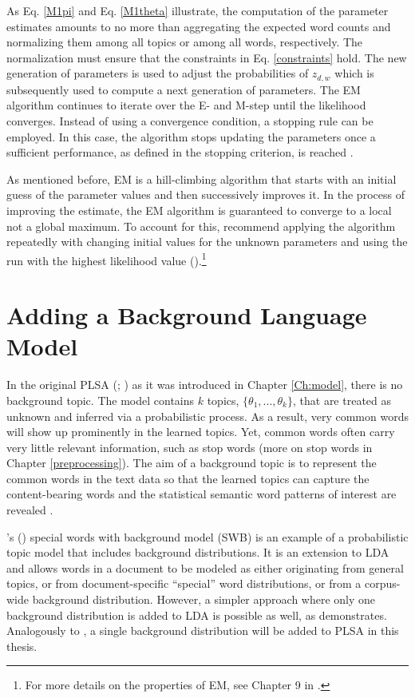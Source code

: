 \documentclass[11pt,a4paper,english,oneside]{book}
\numberwithin{equation}{chapter}
\begin{document}
As Eq. \ref{M1pi} and Eq. \ref{M1theta} illustrate, the computation of the parameter estimates amounts to no more than aggregating the expected word counts and normalizing them among all topics or among all words, respectively. The normalization must ensure that the constraints in Eq. \ref{constraints} hold. The new generation of parameters is used to adjust the probabilities of $z_{d,w}$ which is subsequently used to compute a next generation of parameters. The EM algorithm continues to iterate over the E- and M-step until the likelihood converges. Instead of using a convergence condition, a stopping rule can be employed. In this case, the algorithm stops updating the parameters once a sufficient performance, as defined in the stopping criterion, is reached \citep[pp. 182--183]{Hofmann.2001}. 

As mentioned before, EM is a hill-climbing algorithm that starts with an initial guess of the parameter values and then successively improves it. In the process of improving the estimate, the EM algorithm is guaranteed to converge to a local not a global maximum. To account for this, \citeauthor{Zhai.2016} recommend applying the algorithm repeatedly with changing initial values for the unknown parameters and using the run with the highest likelihood value (\citeyear[pp. 363--368]{Zhai.2016}).\footnote{For more details on the properties of EM, see Chapter 9 in \cite{Bishop.2006}.}

\section{Adding a Background Language Model}\label{Ch:background}


In the original PLSA (\citealp{Hofmann.1999}; \citeyear{Hofmann.2001}) as it was introduced in Chapter \ref{Ch:model}, there is no background topic. The model contains $k$ topics, $\{\theta_1, ..., \theta_k\}$, that are treated as unknown and inferred via a probabilistic process. As a result, very common words will show up prominently in the learned topics. Yet, common words often carry very little relevant information, such as stop words (more on stop words in Chapter \ref{preprocessing}). 
The aim of a background topic is to represent the common words in the text data so that the learned topics can capture the content-bearing words and the statistical semantic word patterns of interest are revealed \cite[pp.7--8]{Darling.2011}. 

\citeauthor{Chem.2007}'s (\citeyear{Chem.2007}) special words with background model (SWB) is an example of a probabilistic topic model that includes background distributions. It is an extension to LDA and allows words in a document to be modeled as either originating from general topics, or from document-specific “special” word distributions, or from a corpus-wide background distribution. However, a simpler approach where only one background distribution is added to LDA is possible as well, as \citet[pp. 7--8]{Darling.2011} demonstrates. Analogously to \cite{Darling.2011}, a single background distribution will be added to PLSA in this thesis.
\end{document}
